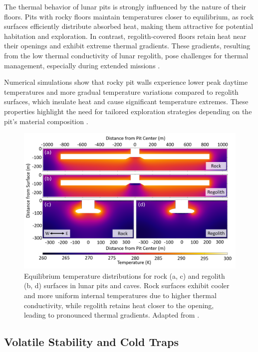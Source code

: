 The thermal behavior of lunar pits is strongly influenced by the nature of their floors. Pits with rocky floors maintain temperatures closer to equilibrium, as rock surfaces efficiently distribute absorbed heat, making them attractive for potential habitation and exploration. In contrast, regolith-covered floors retain heat near their openings and exhibit extreme thermal gradients. These gradients, resulting from the low thermal conductivity of lunar regolith, pose challenges for thermal management, especially during extended missions \cite{thermal-lunar-pits, newer-thermal}.

Numerical simulations show that rocky pit walls experience lower peak daytime temperatures and more gradual temperature variations compared to regolith surfaces, which insulate heat and cause significant temperature extremes. These properties highlight the need for tailored exploration strategies depending on the pit's material composition \cite{thermal-lunar-pits, lunar-pits-numerical-modelling}.

\begin{figure}[H]
    \centering
    \includegraphics[width=0.8\linewidth]{thermal-simulation-lunar-pits-2d-regolith-rock.png}
    \caption{Equilibrium temperature distributions for rock (a, c) and regolith (b, d) surfaces in lunar pits and caves. Rock surfaces exhibit cooler and more uniform internal temperatures due to higher thermal conductivity, while regolith retains heat closer to the opening, leading to pronounced thermal gradients. Adapted from \cite{thermal-lunar-pits}.}
    \label{fig:lunar-pit-equilibrium-temps}
\end{figure}

\subsection{Volatile Stability and Cold Traps}

